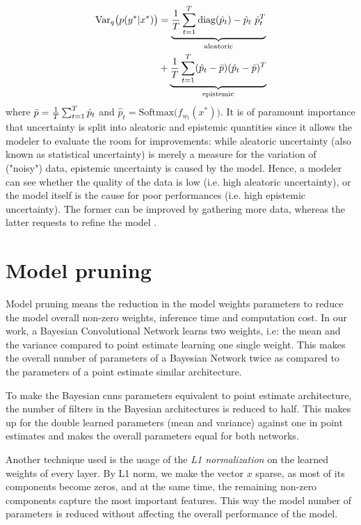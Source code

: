 \begin{equation}
    \begin{aligned}
    \text{Var}_q\big( p(y^*|x^*) \big) &= \underbrace{\frac{1}{T} \sum_{t=1}^T \text{diag}(\hat{p}_t)-\hat{p}_t \ \hat{p}_t^T}_\text{aleatoric} \\ &+ \underbrace{\frac{1}{T}\sum_{t=1}^T (\hat{p}_t - \Bar{p}) (\hat{p}_t - \Bar{p})^T}_\text{epistemic}
    \end{aligned}
\end{equation}
where $\Bar{p} = \frac{1}{T}\sum_{t=1}^T \hat{p}_t$ and $\hat{p}_t = \text{Softmax}\big ( f_{w_{t}}(x^*) \big )$.
\newline It is of paramount importance that uncertainty is split into aleatoric and epistemic quantities since it allows the modeler to evaluate the room for improvements: while aleatoric uncertainty (also known as statistical uncertainty) is merely a measure for the variation of ("noisy") data, epistemic uncertainty is caused by the model. Hence, a modeler can see whether the quality of the data is low (i.e. high aleatoric uncertainty), or the model itself is the cause for poor performances (i.e. high epistemic uncertainty). The former can be improved by gathering more data, whereas the latter requests to refine the model \cite{der2009aleatory}.

\section{Model pruning}

Model pruning means the reduction in the model weights parameters to reduce the model overall non-zero weights, inference time and computation cost. In our work, a Bayesian Convolutional Network learns two weights, i.e: the mean and the variance compared to point estimate learning one single weight. This makes the overall number of parameters of a Bayesian Network twice as compared to the parameters of a point estimate similar architecture.

To make the Bayesian \acp{cnn} parameters equivalent to point estimate architecture, the number of filters in the Bayesian architectures is reduced to half. This makes up for the double learned parameters (mean and variance) against one in point estimates and makes the overall parameters equal for both networks. 

Another technique used is the usage of the \textit{L1 normalization} on the learned weights of every layer.  By L1 norm, we make the vector $x$ sparse, as most of its components become zeros, and at the same time, the remaining non-zero components capture the most important features. This way the model number of parameters is reduced without affecting the overall performance of the model. 
